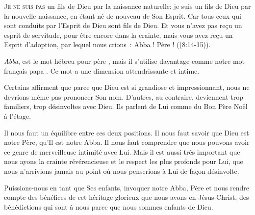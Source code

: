 





\lettrine{J}{e ne suis pas} un fils de Dieu par la naissance naturelle;
 je suis un fils de Dieu par la nouvelle naissance, en étant né de nouveau
 de Son Esprit.
 \og Car tous ceux qui sont conduits par l'Esprit de Dieu sont fils de Dieu.
 Et vous n'avez pas reçu un esprit de servitude, pour être encore
 dans la crainte, mais vous avez reçu un Esprit d'adoption, par lequel
 nous crions~: \og Abba ! Père ! \fg{} ((8:14-15)).

\emph{Abba}, est le mot hébreu pour \og père \fg{},
 mais il s'utilise davantage comme notre mot français \og papa \fg{}.
 Ce mot a une dimension attendrissante et intime.


Certains affirment que parce que Dieu est si grandiose et impressionnant,
 nous ne devrions même pas prononcer Son nom. D'autres, au contraire,
 deviennent trop familiers, trop désinvoltes avec Dieu.
 Ils parlent de Lui comme du \og Bon Père Noël à l'étage. \fg{}

Il nous faut un équilibre entre ces deux positions.
 Il nous faut savoir que Dieu est notre Père, qu'Il est notre Abba.
 Il nous faut comprendre que nous pouvons avoir ce genre de merveilleuse
 intimité avec Lui. Mais il est aussi très important que nous ayons
 la crainte révérencieuse et le respect les plus profonds pour Lui,
 que nous n'arrivions jamais au point où nous penserions à Lui
 de façon désinvolte.

Puissions-nous en tant que Ses enfants, invoquer notre Abba,
 Père et nous rendre compte des bénéfices de cet héritage glorieux
 que nous avons en Jésus-Christ, des bénédictions qui sont à nous
 parce que nous sommes enfants de Dieu. 

\dvrule

